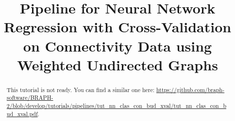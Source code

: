 \documentclass[justified]{tufte-handout}
\title[Regression Cross-Validation Connectivity WU Measure]{Pipeline for Neural Network Regression with Cross-Validation on Connectivity Data using Weighted Undirected Graphs}
\begin{document}
\maketitle

\begin{abstract}
\noindent
This tutorial is not ready. You can find a similar one here: \url{https://github.com/braph-software/BRAPH-2/blob/develop/tutorials/pipelines/tut_nn_clas_con_bud_xval/tut_nn_clas_con_bud_xval.pdf}.
\end{abstract}
\end{document}
